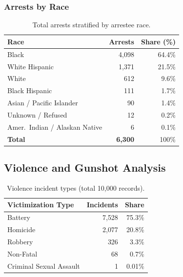 \documentclass[11pt,a4paper]{article}
\begin{document}
\subsubsection{Arrests by Race}

\begin{table}[H]
\centering
\caption{Total arrests stratified by arrestee race.}
\label{tab:race}
\begin{tabular}{@{}lr@{\hspace{1cm}}r@{}}
\toprule
\textbf{Race} & \textbf{Arrests} & \textbf{Share (\%)} \\
\midrule
Black                        & 4{,}098 & 64.4\% \\
White Hispanic               & 1{,}371 & 21.5\% \\
White                        &   612 &  9.6\% \\
Black Hispanic               &   111 &  1.7\% \\
Asian / Pacific Islander     &    90 &  1.4\% \\
Unknown / Refused            &    12 &  0.2\% \\
Amer.\ Indian / Alaskan Native &   6 &  0.1\% \\
\midrule
\textbf{Total}               & \textbf{6{,}300} & 100\% \\
\bottomrule
\end{tabular}
\end{table}

\subsection{Violence and Gunshot Analysis}

\begin{table}[H]
\centering
\caption{Violence incident types (total 10{,}000 records).}
\label{tab:violence}
\begin{tabular}{@{}lrr@{}}
\toprule
\textbf{Victimization Type} & \textbf{Incidents} & \textbf{Share} \\
\midrule
Battery                   & 7{,}528 & 75.3\% \\
Homicide                  & 2{,}077 & 20.8\% \\
Robbery                   &   326 &  3.3\% \\
Non-Fatal                 &    68 &  0.7\% \\
Criminal Sexual Assault   &     1 & 0.01\% \\
\bottomrule
\end{tabular}
\end{table}
\end{document}
